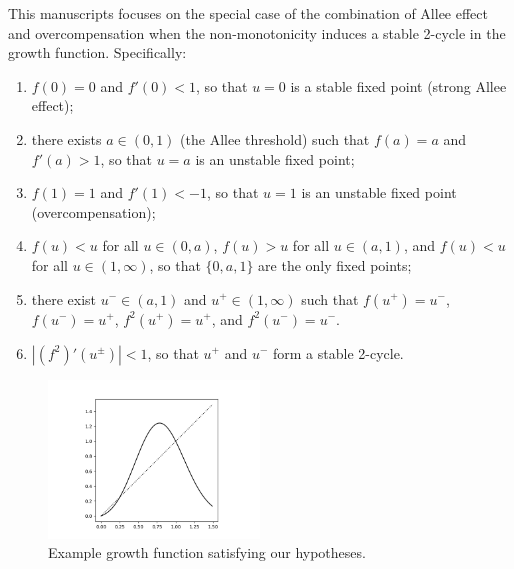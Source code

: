 \documentclass{article}
\theoremstyle{definition}
\numberwithin{equation}{section}
\begin{document}
This manuscripts focuses on the special case of the combination of Allee effect and overcompensation when the non-monotonicity induces a stable 2-cycle in the growth function. Specifically:
\begin{enumerate}[(G1)]

  \item $f(0)=0$ and $f'(0)<1$, so that $u=0$ is a stable fixed point (strong Allee effect);
  
  \item there exists $a \in (0,1)$ (the Allee threshold) such that $f(a)=a$ and $f'(a)>1$, so that $u=a$ is an unstable fixed point;
  
  \item $f(1)=1$ and $f'(1)<-1$, so that $u=1$ is an unstable fixed point (overcompensation);
  
  \item $f(u)<u$ for all $u\in(0,a)$, $f(u)>u$ for all $u \in (a,1)$, and $f(u)<u$ for all $u \in (1,\infty)$, so that $\{0,a,1\}$ are the only fixed points;
  
  \item there exist $u^- \in (a,1)$ and $u^+ \in (1,\infty)$ such that $f(u^+)=u^-$, $f(u^-)=u^+$, $f^2(u^+)=u^+$, and $f^2(u^-)=u^-$.
  
  \item $|(f^2)'(u^\pm)|<1$, so that $u^+$ and $u^-$ form a stable 2-cycle.
  
\end{enumerate}


\begin{figure}
  \centering
  \includegraphics[width=0.5\textwidth]{figures/fig1a.png}
  \caption{Example growth function satisfying our hypotheses.}
\end{figure}

\end{document}
